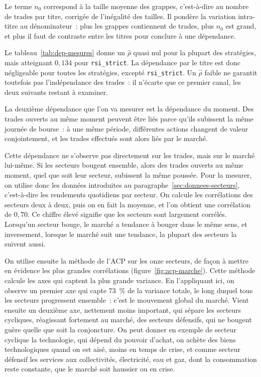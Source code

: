 Le terme $n_0$ correspond à la taille moyenne des grappes, c'est-à-dire
au nombre de trades par titre, corrigée de l'inégalité des tailles. Il
pondère la variation intra-titre au dénominateur~: plus les grappes
contiennent de trades, plus $n_0$ est grand, et plus il faut de
contraste entre les titres pour conclure à une dépendance.

Le tableau~\ref{tab:dep-mesures} donne un $\hat\rho$ quasi nul pour la
plupart des stratégies, mais atteignant $0{,}134$ pour
\texttt{rsi\_strict}. La dépendance par le titre est donc négligeable
pour toutes les stratégies, excepté \texttt{rsi\_strict}. Un $\hat\rho$
faible ne garantit toutefois pas l'indépendance des trades~: il n'écarte
que ce premier canal, les deux suivants restant à examiner.


La deuxième dépendance que l'on va mesurer est la dépendance du moment.
Des trades ouverts au même moment peuvent être liés parce qu'ils
subissent la même journée de bourse~: à une même période, différentes
actions changent de valeur conjointement, et les trades effectués sont
alors liés par le marché.

Cette dépendance ne s'observe pas directement sur les trades, mais sur
le marché lui-même. Si les secteurs bougent ensemble, alors des trades
ouverts au même moment, quel que soit leur secteur, subissent la même
poussée. Pour la mesurer, on utilise donc les données introduites au
paragraphe~\ref{sec:donnees-secteurs}, c'est-à-dire les rendements
quotidiens par secteur. On calcule les corrélations des secteurs deux à
deux, puis on en fait la moyenne, et l'on obtient une corrélation de
$0{,}70$. Ce chiffre élevé signifie que les secteurs sont largement
corrélés. Lorsqu'un secteur bouge, le marché a tendance à bouger dans le
même sens, et inversement, lorsque le marché suit une tendance, la
plupart des secteurs la suivent aussi.

On utilise ensuite la méthode de l'ACP sur les onze secteurs, de façon à
mettre en évidence les plus grandes corrélations
(figure~\ref{fig:acp-marche}). Cette méthode calcule les axes qui
captent la plus grande variance. En l'appliquant ici, on observe un
premier axe qui capte 73~\% de la variance totale, le long duquel tous
les secteurs progressent ensemble~: c'est le mouvement global du marché.
Vient ensuite un deuxième axe, nettement moins important, qui sépare les
secteurs cycliques, réagissant fortement au marché, des secteurs
défensifs, qui ne bougent guère quelle que soit la conjoncture. On peut
donner en exemple de secteur cyclique la technologie, qui dépend du
pouvoir d'achat, on achète des biens technologiques quand on est aisé,
moins en temps de crise, et comme secteur défensif les services aux
collectivités, électricité, eau et gaz, dont la consommation reste
constante, que le marché soit haussier ou en crise.

